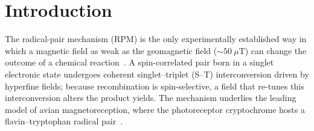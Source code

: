 \documentclass[aps,prx,reprint,superscriptaddress,nofootinbib,floatfix]{revtex4-2}
\begin{document}
\section{Introduction}  

The radical-pair mechanism (RPM) is the only experimentally established way in
which a magnetic field as weak as the geomagnetic field ($\sim50~\mu$T) can change
the outcome of a chemical reaction~\cite{Steiner1989,Hore2016,Timmel1998}. A spin-correlated
pair born in a singlet electronic state undergoes coherent singlet--triplet (S--T)
interconversion driven by hyperfine fields; because recombination is
spin-selective, a field that re-tunes this interconversion alters the product
yields. The mechanism underlies the leading model of avian magnetoreception, where
the photoreceptor cryptochrome hosts a flavin--tryptophan radical
pair~\cite{Ritz2000,Maeda2012,Hore2016,Xu2021,Hiscock2016}.
\end{document}
